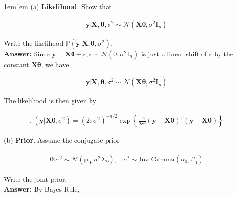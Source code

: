 \documentclass[11pt]{article}
\begin{document}
    \begin{adjustwidth}{1em}{1em}
        (a) \textbf{Likelihood}. Show that

        \begin{align*}
            \mathbf{y} | \mathbf{X}, \boldsymbol{\theta}, \sigma^2 \sim \mathcal{N}(\mathbf{X\theta},
            \sigma^2 \mathbf{I}_n)
        \end{align*}

        Write the likelihood $\mathbb{P}(\mathbf{y} | \mathbf{X}, \boldsymbol{\theta}, \sigma^2)$. \\

        \textbf{Answer:} Since $\mathbf{y} = \mathbf{X} \boldsymbol{\theta} + \epsilon, \epsilon \sim
        \mathcal{N}(0, \sigma^2\mathbf{I}_n)$ is just a linear shift of $\epsilon$ by the constant
        $\mathbf{X}\boldsymbol{\theta}$, we have 

        \begin{align*}
            \mathbf{y} | \mathbf{X}, \boldsymbol{\theta}, \sigma^2 \sim \mathcal{N}(\mathbf{X}
            \boldsymbol{\theta} ,\sigma^2 \mathbf{I}_n)
        \end{align*}

        The likelihood is then given by

        \begin{align*}
            \mathbb{P}(\mathbf{y} | \mathbf{X} \boldsymbol{\theta}, \sigma^2) = (2\pi\sigma^2)^{-n/
            2} \exp \left\{\frac{-1}{2\sigma^2}(\mathbf{y} - \mathbf{X}\boldsymbol{\theta})^T
            (\mathbf{y} - \mathbf{X}\boldsymbol{\theta})\right\}
        \end{align*}

        (b) \textbf{Prior}. Assume the conjugate prior

        \begin{align*}
            \begin{matrix}
                \boldsymbol{\theta} | \sigma^2 \sim \mathcal{N}(\boldsymbol{\mu}_0, \sigma^2
                \Sigma_0), 
                & \sigma^2 \sim \text{Inv-Gamma}(\alpha_0, \beta_0)
            \end{matrix}
        \end{align*}

        Write the joint prior. \\ 

        \textbf{Answer:} By Bayes Rule,


\end{adjustwidth}
\end{document}
